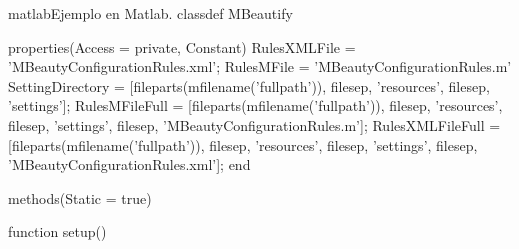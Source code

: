 \begin{sourcecode}{matlab}{Ejemplo en Matlab.}
classdef MBeautify
    
    properties(Access = private, Constant)
        RulesXMLFile = 'MBeautyConfigurationRules.xml';
        RulesMFile = 'MBeautyConfigurationRules.m'
        SettingDirectory = [fileparts(mfilename('fullpath')), filesep, 'resources', filesep, 'settings'];
        RulesMFileFull = [fileparts(mfilename('fullpath')), filesep, 'resources', filesep, 'settings', filesep, 'MBeautyConfigurationRules.m'];
        RulesXMLFileFull = [fileparts(mfilename('fullpath')), filesep, 'resources', filesep, 'settings', filesep, 'MBeautyConfigurationRules.xml'];
    end
    
    
    methods(Static = true)
        
        function setup()
            

\end{sourcecode}
